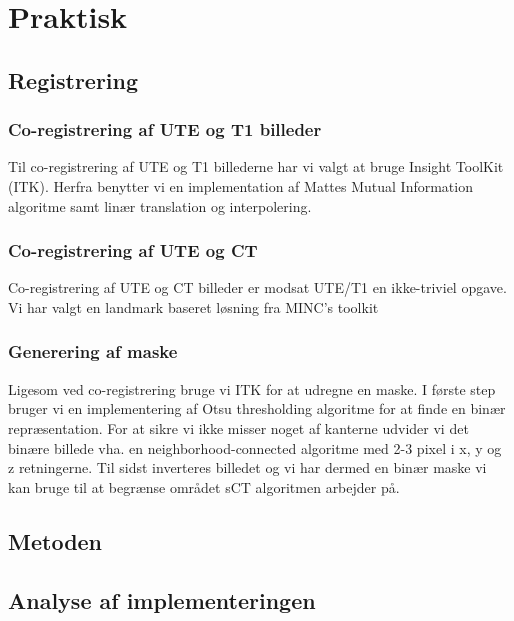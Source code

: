 \section{Praktisk}

\subsection{Registrering}


\subsubsection{Co-registrering af UTE og T1 billeder}

Til co-registrering af UTE og T1 billederne har vi valgt at bruge Insight ToolKit
(ITK). Herfra benytter vi en implementation af Mattes Mutual Information algoritme
samt linær translation og interpolering.

\subsubsection{Co-registrering af UTE og CT}

Co-registrering af UTE og CT billeder er modsat UTE/T1 en ikke-triviel opgave. Vi
har valgt en landmark baseret løsning fra MINC's toolkit

\subsubsection{Generering af maske}

Ligesom ved co-registrering bruge vi ITK for at udregne en maske. I første step
bruger vi en implementering af Otsu thresholding algoritme for at finde en binær
repræsentation. For at sikre vi ikke misser noget af kanterne udvider vi det 
binære billede vha. en neighborhood-connected algoritme med 2-3 pixel i x, y og z
retningerne. Til sidst inverteres billedet og vi har dermed en binær maske vi kan
bruge til at begrænse området sCT algoritmen arbejder på.

\subsection{Metoden}


\subsection{Analyse af implementeringen}

